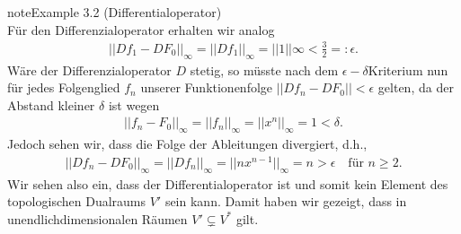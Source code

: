 \documentclass[letterpaper,10pt,english]{jupyterBook}
\begin{document}
\begin{sphinxadmonition}{note}{Example 3.2 (Differentialoperator)}
\begin{equation*}
\end{equation*}
\sphinxAtStartPar
Für den Differenzialoperator erhalten wir analog
\begin{equation*}
\begin{split}||Df_1 - DF_0||_\infty = ||Df_1||_\infty = ||1||\infty < \frac{3}{2} =: \epsilon.\end{split}
\end{equation*}
\sphinxAtStartPar
Wäre der Differenzialoperator \(D\) stetig, so müsste nach dem \(\epsilon-\delta\)\sphinxhyphen{}Kriterium nun für jedes Folgenglied \(f_n\) unserer Funktionenfolge \(||Df_n - DF_0|| < \epsilon\) gelten, da der Abstand kleiner \(\delta\) ist wegen
\begin{equation*}
\begin{split}||f_n - F_0||_\infty = ||f_n||_\infty = ||x^n||_\infty = 1 < \delta.\end{split}
\end{equation*}
\sphinxAtStartPar
Jedoch sehen wir, dass die Folge der Ableitungen divergiert, d.h.,
\begin{equation*}
\begin{split}||Df_n - DF_0||_\infty = ||Df_n||_\infty = ||nx^{n-1}||_\infty = n > \epsilon \quad \text{für } n\geq 2.\end{split}
\end{equation*}
\sphinxAtStartPar
Wir sehen also ein, dass der Differentialoperator  ist und somit kein Element des topologischen Dualraums \(V'\) sein kann.
Damit haben wir gezeigt, dass in unendlich\sphinxhyphen{}dimensionalen Räumen \(V' \subsetneq V^\ast\) gilt.
\end{sphinxadmonition}
\end{document}
